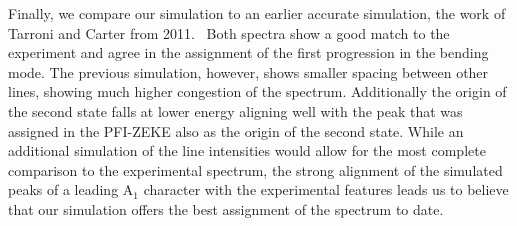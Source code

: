 \documentclass[12pt,pra,aps,superscriptaddress]{revtex4-2}
\begin{document}
Finally, we compare our simulation to an earlier accurate simulation, the work
of Tarroni and Carter from 2011.~\cite{tarroni:O3:2011} Both spectra show a
good match to the experiment and agree in the assignment of the first
progression in the bending mode. The previous simulation, however, shows
smaller spacing between other lines, showing much higher congestion of the
spectrum. Additionally the origin of the second state falls at lower energy
aligning well with the peak that was assigned in the PFI-ZEKE also as the
origin of the second state.  While an additional simulation of the line
intensities would allow for the most complete comparison to the experimental
spectrum, the strong alignment of the simulated peaks of a leading
A$_1$ character with the experimental features leads us to believe that our
simulation offers the best assignment of the spectrum to date.
\end{document}
